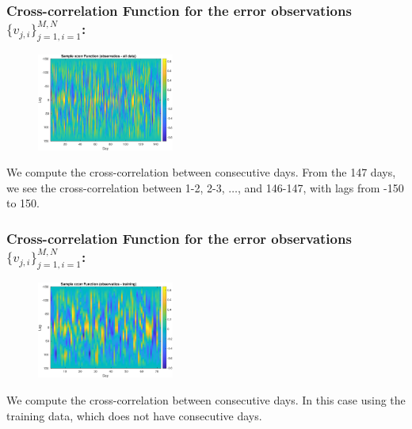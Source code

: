 \documentclass[aspectratio=169]{beamer}\usepackage[utf8]{inputenc}
\begin{document}
\begin{frame}\frametitle{Cross-correlation Function for the error observations $\{v_{j,i}\}_{j=1,i=1}^{M,N}$:}

\begin{figure}[ht!]
\centering
\includegraphics[width=0.4\textwidth]{../../MATLAB_Files/Results/cross_correlation/obs_alldata.eps}
\end{figure}
We compute the cross-correlation between consecutive days. From the 147 days, we see the cross-correlation between 1-2, 2-3, $\dots$, and 146-147, with lags from -150 to 150.
\end{frame}


\begin{frame}\frametitle{Cross-correlation Function for the error observations $\{v_{j,i}\}_{j=1,i=1}^{M,N}$:}

\begin{figure}[ht!]
\centering
\includegraphics[width=0.4\textwidth]{../../MATLAB_Files/Results/cross_correlation/obs_training.eps}
\end{figure}
We compute the cross-correlation between consecutive days. In this case using the training data, which does not have consecutive days.

\end{frame}

\end{document}
